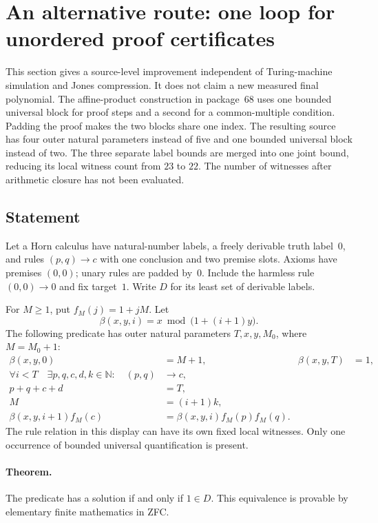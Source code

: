 \section{An alternative route: one loop for unordered proof certificates}
\label{sec:single-loop}

This section gives a source-level improvement independent of Turing-machine
simulation and Jones compression.  It does not claim a new measured final
polynomial.  The affine-product construction in package~68 uses one bounded
universal block for proof steps and a second for a common-multiple condition.
Padding the proof makes the two blocks share one index.  The resulting source
has four outer natural parameters instead of five and one bounded universal
block instead of two.  The three separate label bounds are merged into one joint bound, reducing
its local witness count from $23$ to $22$.
The number of witnesses after arithmetic closure has not been evaluated.

\subsection{Statement}

Let a Horn calculus have natural-number labels, a freely derivable truth
label~$0$, and rules $(p,q)\longrightarrow c$ with one conclusion and two
premise slots.  Axioms have premises $(0,0)$; unary rules are padded by~$0$.
Include the harmless rule $(0,0)\longrightarrow0$ and fix target~$1$.
Write $D$ for its least set of derivable labels.

For $M\geq1$, put $f_M(j)=1+jM$.  Let
\[
 \beta(x,y,i)=x\bmod\bigl(1+(i+1)y\bigr).
\]
The following predicate has outer natural parameters $T,x,y,M_0$, where
$M=M_0+1$:
\begin{align}
 \beta(x,y,0)&=M+1,& \beta(x,y,T)&=1, \label{eq:sl-endpoint}\\
 \forall i<T\quad\exists p,q,c,d,k\in\mathbb N:\quad
 (p,q)&\longrightarrow c, \nonumber\\
 p+q+c+d&=T,\label{eq:sl-bounds}\\
 M&=(i+1)k,\label{eq:sl-common}\\
 \beta(x,y,i+1)f_M(c)&=
 \beta(x,y,i)f_M(p)f_M(q).\label{eq:sl-transition}
\end{align}
The rule relation in this display can have its own fixed local witnesses.
Only one occurrence of bounded universal quantification is present.

\paragraph{Theorem.}
The predicate has a solution if and only if $1\in D$.
This equivalence is provable by elementary finite mathematics in ZFC.


